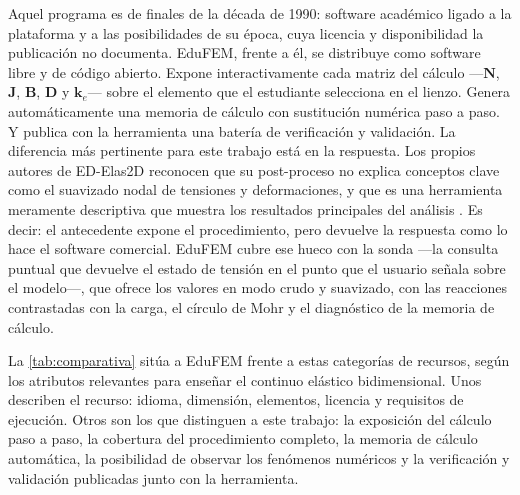Aquel programa es de finales de la década de 1990: software académico ligado a la plataforma y a las posibilidades de su época, cuya licencia y disponibilidad la publicación no documenta. EduFEM, frente a él, se distribuye como software libre y de código abierto. Expone interactivamente cada matriz del cálculo —$\bm{N}$, $\bm{J}$, $\bm{B}$, $\bm{D}$ y $\bm{k}_e$— sobre el elemento que el estudiante selecciona en el lienzo. Genera automáticamente una memoria de cálculo con sustitución numérica paso a paso. Y publica con la herramienta una batería de verificación y validación. La diferencia más pertinente para este trabajo está en la respuesta. Los propios autores de ED-Elas2D reconocen que su post-proceso no explica conceptos clave como el suavizado nodal de tensiones y deformaciones, y que es una herramienta meramente descriptiva que muestra los resultados principales del análisis \autocite[p.~253]{suarez1998edelas2d}. Es decir: el antecedente expone el procedimiento, pero devuelve la respuesta como lo hace el software comercial. EduFEM cubre ese hueco con la sonda —la consulta puntual que devuelve el estado de tensión en el punto que el usuario señala sobre el modelo—, que ofrece los valores en modo crudo y suavizado, con las reacciones contrastadas con la carga, el círculo de Mohr y el diagnóstico de la memoria de cálculo.

La \autoref{tab:comparativa} sitúa a EduFEM frente a estas categorías de recursos, según los atributos relevantes para enseñar el continuo elástico bidimensional. Unos describen el recurso: idioma, dimensión, elementos, licencia y requisitos de ejecución. Otros son los que distinguen a este trabajo: la exposición del cálculo paso a paso, la cobertura del procedimiento completo, la memoria de cálculo automática, la posibilidad de observar los fenómenos numéricos y la verificación y validación publicadas junto con la herramienta.

